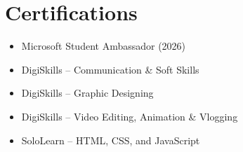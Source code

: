 \section*{Certifications}

\begin{itemize}[leftmargin=*]
    \item Microsoft Student Ambassador (2026)
    \item DigiSkills -- Communication \& Soft Skills
    \item DigiSkills -- Graphic Designing
    \item DigiSkills -- Video Editing, Animation \& Vlogging
    \item SoloLearn -- HTML, CSS, and JavaScript
\end{itemize}